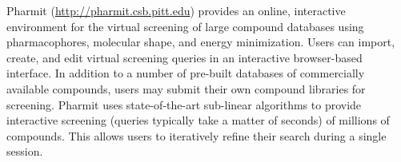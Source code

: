 Pharmit (\url{http://pharmit.csb.pitt.edu}) provides an online, interactive environment for the virtual screening of large compound databases using pharmacophores, molecular shape, and energy minimization.  Users can import, create, and edit virtual screening queries in an interactive browser-based interface.  In addition to a number of pre-built databases of commercially available compounds, users may submit their own compound libraries for screening.  Pharmit uses state-of-the-art sub-linear algorithms to provide interactive screening (queries typically take a matter of seconds) of millions of compounds. This allows users to iteratively refine their search during a single session.
